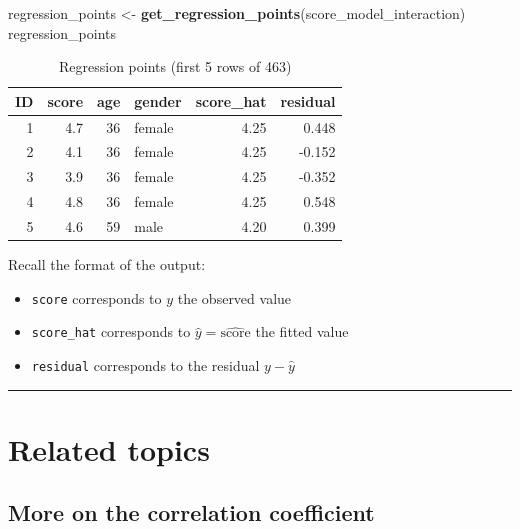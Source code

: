 \documentclass[12pt, krantz2,]{krantz}
\makeatletter
\newenvironment{Shaded}{\begin{snugshade}}{\end{snugshade}}
\newcommand{\KeywordTok}[1]{\textcolor[rgb]{0.27,0.27,0.27}{\textbf{#1}}}
\newcommand{\NormalTok}[1]{#1}
\newcommand{\StringTok}[1]{\textcolor[rgb]{0.5,0.5,0.5}{#1}}
\providecommand{\tightlist}{%
  \setlength{\itemsep}{0pt}\setlength{\parskip}{0pt}}
\newenvironment{kframe}{%
\medskip{}
\setlength{\fboxsep}{.8em}
 \def\at@end@of@kframe{}%
 \ifinner\ifhmode%
  \def\at@end@of@kframe{\end{minipage}}%
  \begin{minipage}{\columnwidth}%
 \fi\fi%
 \def\FrameCommand##1{\hskip\@totalleftmargin \hskip-\fboxsep
 \colorbox{shadecolor}{##1}\hskip-\fboxsep
     \hskip-\linewidth \hskip-\@totalleftmargin \hskip\columnwidth}%
 \MakeFramed {\advance\hsize-\width
   \@totalleftmargin\z@ \linewidth\hsize
   \@setminipage}}%
 {\par\unskip\endMakeFramed%
 \at@end@of@kframe}
\renewenvironment{Shaded}{\begin{kframe}}{\end{kframe}}
\makeatother
\begin{document}
\begin{Shaded}
\begin{Highlighting}[]
\NormalTok{regression_points <-}\StringTok{ }\KeywordTok{get_regression_points}\NormalTok{(score_model_interaction)}
\NormalTok{regression_points}
\end{Highlighting}
\end{Shaded}

\begin{table}[H]

\caption{\label{tab:model4-points-table}Regression points (first 5 rows of 463)}
\centering
\fontsize{10}{12}\selectfont
\begin{tabular}{rrrlrr}
\toprule
ID & score & age & gender & score\_hat & residual\\
\midrule
1 & 4.7 & 36 & female & 4.25 & 0.448\\
2 & 4.1 & 36 & female & 4.25 & -0.152\\
3 & 3.9 & 36 & female & 4.25 & -0.352\\
4 & 4.8 & 36 & female & 4.25 & 0.548\\
5 & 4.6 & 59 & male & 4.20 & 0.399\\
\bottomrule
\end{tabular}
\end{table}

Recall the format of the output:

\begin{itemize}
\tightlist
\item
  \texttt{score} corresponds to \(y\) the observed value
\item
  \texttt{score\_hat} corresponds to \(\widehat{y} = \widehat{\mbox{score}}\) the fitted value
\item
  \texttt{residual} corresponds to the residual \(y - \widehat{y}\)
\end{itemize}

\begin{center}\rule{0.5\linewidth}{\linethickness}\end{center}

\hypertarget{related-topics-1}{%
\section{Related topics}\label{related-topics-1}}

\hypertarget{correlationcoefficient2}{%
\subsection{More on the correlation coefficient}\label{correlationcoefficient2}}
\end{document}
